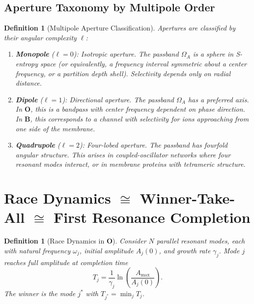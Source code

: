\documentclass[twocolumn,10pt]{article}
\newtheorem{definition}[theorem]{Definition}
\theoremstyle{remark}
\newcommand{\CatO}{\mathbf{O}}
\newcommand{\CatB}{\mathbf{B}}
\begin{document}
\subsection{Aperture Taxonomy by Multipole Order}

\begin{definition}[Multipole Aperture Classification]
\label{def:multipole_aperture}
Apertures are classified by their angular complexity $\ell$:
\begin{enumerate}[label=(\roman*)]
    \item \textbf{Monopole} ($\ell = 0$): Isotropic aperture.
    The passband $\Omega_A$ is a sphere in S-entropy space (or equivalently, a frequency interval symmetric about a center frequency, or a partition depth shell).
    Selectivity depends only on radial distance.

    \item \textbf{Dipole} ($\ell = 1$): Directional aperture.
    The passband $\Omega_A$ has a preferred axis.
    In $\CatO$, this is a bandpass with center frequency dependent on phase direction.
    In $\CatB$, this corresponds to a channel with selectivity for ions approaching from one side of the membrane.

    \item \textbf{Quadrupole} ($\ell = 2$): Four-lobed aperture.
    The passband has fourfold angular structure.
    This arises in coupled-oscillator networks where four resonant modes interact, or in membrane proteins with tetrameric structure.
\end{enumerate}
\end{definition}

\section{\texorpdfstring{Race Dynamics $\cong$ Winner-Take-All $\cong$ First Resonance Completion}{Race Dynamics = Winner-Take-All = First Resonance Completion}}
\label{sec:race}

\begin{definition}[Race Dynamics in $\CatO$]
\label{def:race_O}
Consider $N$ parallel resonant modes, each with natural frequency $\omega_j$, initial amplitude $A_j(0)$, and growth rate $\gamma_j$.
Mode $j$ reaches full amplitude at completion time
\begin{equation}
T_j = \frac{1}{\gamma_j}\ln\!\left(\frac{A_{\mathrm{max}}}{A_j(0)}\right).
\label{eq:completion_time}
\end{equation}
The \emph{winner} is the mode $j^*$ with $T_{j^*} = \min_j T_j$.
\end{definition}
\end{document}

